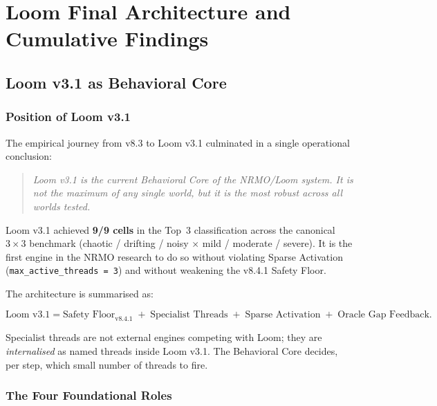 
\part{Loom Final Architecture and Cumulative Findings}
\label{part:loom_final}

\chapter{Loom v3.1 as Behavioral Core}
\label{ch:loom_v31_core}

\section{Position of Loom v3.1}

The empirical journey from v8.3 to Loom v3.1 culminated in a single
operational conclusion:

\begin{quote}
\emph{Loom v3.1 is the current Behavioral Core of the NRMO/Loom system.
It is not the maximum of any single world, but it is the most robust
across all worlds tested.}
\end{quote}

Loom v3.1 achieved \textbf{9/9 cells} in the Top~3 classification
across the canonical $3 \times 3$ benchmark (chaotic / drifting / noisy
$\times$ mild / moderate / severe). It is the first engine in the
NRMO research to do so without violating Sparse Activation
(\texttt{max\_active\_threads = 3}) and without weakening the v8.4.1
Safety Floor.

The architecture is summarised as:

\begin{equation}
\text{Loom v3.1}
  = \text{Safety Floor}_{\text{v8.4.1}}
  \;+\; \text{Specialist Threads}
  \;+\; \text{Sparse Activation}
  \;+\; \text{Oracle Gap Feedback}.
\end{equation}

Specialist threads are not external engines competing with Loom; they
are \emph{internalised} as named threads inside Loom v3.1. The
Behavioral Core decides, per step, which small number of threads to
fire.

\section{The Four Foundational Roles}

